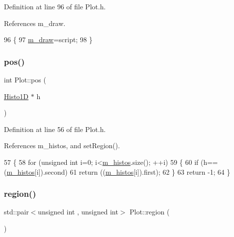 Definition at line 96 of file Plot.\+h.



References m\+\_\+draw.


\begin{DoxyCode}
96                              \{
97     \hyperlink{classPlot_a83ffbf3effe6a2f8befa6375882f3994}{m\_draw}=script;
98   \}
\end{DoxyCode}
\mbox{\label{classPlot_a3f7d4915b045844af0773d09d0c185ad}} 
\subsubsection{\texorpdfstring{pos()}{pos()}}
{\footnotesize\ttfamily int Plot\+::pos (\begin{DoxyParamCaption}\item[{\hyperlink{classHisto1D}{Histo1D} $\ast$}]{h }\end{DoxyParamCaption})\hspace{0.3cm}{\ttfamily [inline]}}



Definition at line 56 of file Plot.\+h.



References m\+\_\+histos, and set\+Region().


\begin{DoxyCode}
57   \{
58     \textcolor{keywordflow}{for} (\textcolor{keywordtype}{unsigned} \textcolor{keywordtype}{int} i=0; i<\hyperlink{classPlot_a7edebf2b275223b8ce55f6ef3b2da0cc}{m\_histos}.size(); ++i)
59     \{
60       \textcolor{keywordflow}{if} (h==(\hyperlink{classPlot_a7edebf2b275223b8ce55f6ef3b2da0cc}{m\_histos}[i]).second)
61         \textcolor{keywordflow}{return} ((\hyperlink{classPlot_a7edebf2b275223b8ce55f6ef3b2da0cc}{m\_histos}[i]).first);
62     \}
63     \textcolor{keywordflow}{return} -1;
64   \}
\end{DoxyCode}
\mbox{\label{classPlot_ae493b21749049d75cbb7282b1e1b9ab4}} 
\subsubsection{\texorpdfstring{region()}{region()}}
{\footnotesize\ttfamily std\+::pair$<$unsigned int , unsigned int$>$ Plot\+::region (\begin{DoxyParamCaption}{ }\end{DoxyParamCaption})\hspace{0.3cm}{\ttfamily [inline]}}



